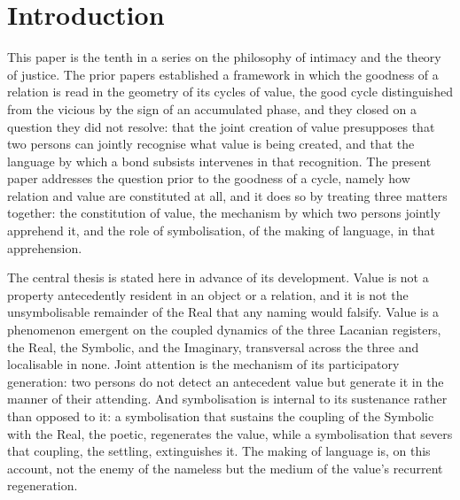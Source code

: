 \section{Introduction}
\label{p10:sec:intro}

\noindent
This paper is the tenth in a series on the philosophy of intimacy and the theory of justice. The prior papers established a framework in which the goodness of a relation is read in the geometry of its cycles of value, the good cycle distinguished from the vicious by the sign of an accumulated phase, and they closed on a question they did not resolve: that the joint creation of value presupposes that two persons can jointly recognise what value is being created, and that the language by which a bond subsists intervenes in that recognition. The present paper addresses the question prior to the goodness of a cycle, namely how relation and value are constituted at all, and it does so by treating three matters together: the constitution of value, the mechanism by which two persons jointly apprehend it, and the role of symbolisation, of the making of language, in that apprehension.

The central thesis is stated here in advance of its development. Value is not a property antecedently resident in an object or a relation, and it is not the unsymbolisable remainder of the Real that any naming would falsify. Value is a phenomenon emergent on the coupled dynamics of the three Lacanian registers, the Real, the Symbolic, and the Imaginary, transversal across the three and localisable in none. Joint attention is the mechanism of its participatory generation: two persons do not detect an antecedent value but generate it in the manner of their attending. And symbolisation is internal to its sustenance rather than opposed to it: a symbolisation that sustains the coupling of the Symbolic with the Real, the poetic, regenerates the value, while a symbolisation that severs that coupling, the settling, extinguishes it. The making of language is, on this account, not the enemy of the nameless but the medium of the value's recurrent regeneration.

